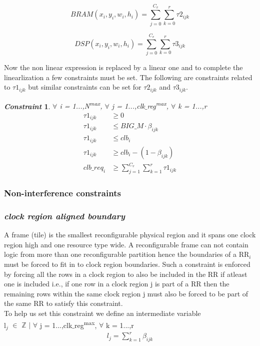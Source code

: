 \documentclass[conference]{IEEEtran}
\newtheorem{constraint}{\textit{Constraint}}
\begin{document}
\begin{equation}
BRAM(x_i,y_i,w_i,h_i) = \sum_{j=0}^{C_v} \sum_{k=0}^{r} \tau2_{ijk}
\end{equation}

\begin{equation}
DSP(x_i,y_i,w_i,h_i) = \sum_{j=0}^{C_v} \sum_{k=0}^{r} \tau3_{ijk}
\end{equation}

Now the non linear expression is replaced by a linear one and to complete the linearlization a few constraints must be set. The following are constraints related to $\tau1_{ijk}$ but similar constraints can be set for $\tau2_{ijk}$ and $\tau3_{ijk}$.

\begin{constraint} $\forall$ i = 1...,N\textsuperscript{max}, $\forall$ j = 1...,clk$\_$reg\textsuperscript{max}, $\forall$ k = 1...,r
\begin{equation}
\begin{split}
\tau1_{ijk} & \geq 0 \\
\tau1_{ijk} & \leq BIG\_M \cdot \beta_{ijk} \\ 
\tau1_{ijk} & \leq clb_i \\
\tau1_{ijk} & \geq clb_i - (1 - \beta_{ijk}) \\
clb\_req_i  & \geq \sum_{j=1}^{C_v} \sum_{k=1}^{r} \tau1_{ijk}
\end{split}
\end{equation}
\end{constraint}


\subsubsection{\textbf{Non-interference constraints}}
\subsubsection*{\textit {clock region aligned boundary}}  
A frame (tile) is the smallest reconfigurable physical region and it spans one clock region high and one resource type wide. A reconfigurable frame can not contain logic from more than one reconfigurable partition hence the boundaries of a RR$_i$ must be forced to fit in to clock region boundaries. 
Such a constraint is enforced by forcing all the rows in a clock region to also be included in the RR if atleast one is included i.e., if one row in a clock region j is part of a RR then the remaining rows within the same clock region j must also be forced to be part of the same RR to satisfy this constraint. \\
To help us set this constraint we define an intermediate variable \\
l$_{j}$  $\in$ $\mathbb{Z}$ $\mid$ $\forall$ j = 1...,clk$\_$reg\textsuperscript{max}, $\forall$ k = 1...,r
\begin{equation}
\begin{split}
l_j = \sum_{k=1}^{r} \beta_{ijk}
\end{split}
\end{equation}
\end{document}
